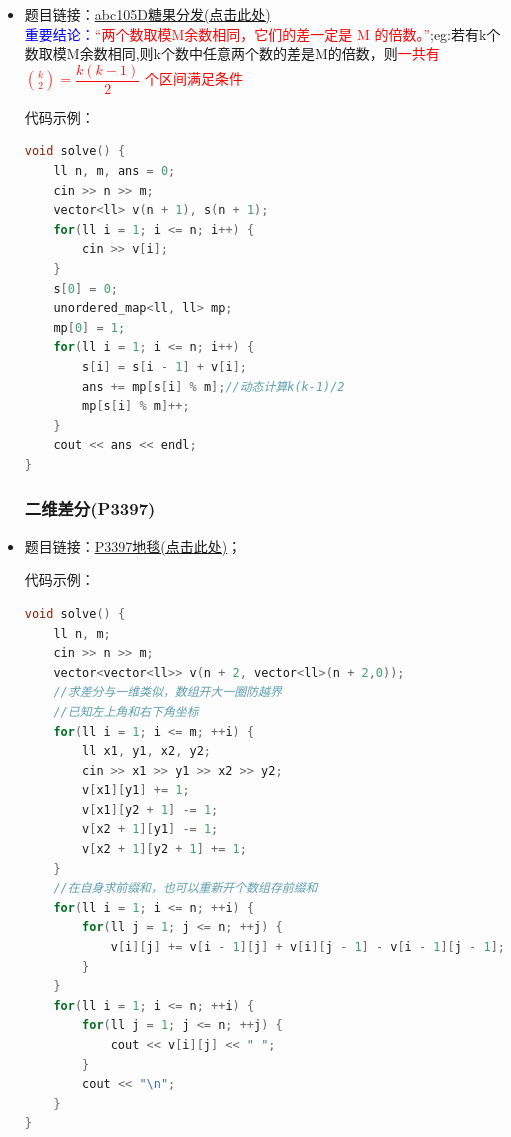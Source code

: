 \begin{itemize}
\begin{lstlisting}[language=C++]
int main() {
	i64 n, m, c;
	cin >> n >> m >> c;
	for (i64 i = 1; i <= n; i++) {
		for (i64 j = 1; j <= m; j++) {
			cin >> v[i][j];
		}
	}
	//计算每个位置的前缀和，以便计算后面的区间和；
	for (i64 i = 1; i <= n; i++) {
		for (i64 j = 1; j <= m; j++) {
			a[i][j] = a[i - 1][j] + a[i][j - 1] - a[i - 1][j - 1] + v[i][j];
		}
	}
	i64 x1, x2, y1, y2, max = 0, row = 0, col = 0;
	for (i64 k = 1; k <= m - c + 1; k++) {
		for (i64 t = 1; t <= n - c + 1; t++) {
			x1 = k;
			y1 = t;
			x2 = x1 + c - 1;
			y2 = y1 + c - 1;
			//知道区间的左上角和右下角坐标就可以求这个矩形内的和
			if ((a[x2][y2] - a[x2][y1 - 1] - a[x1 - 1][y2] + a[x1 - 1][y1 - 1]) > max) {
				max = a[x2][y2] - a[x2][y1 - 1] - a[x1 - 1][y2] + a[x1 - 1][y1 - 1];
				row = x1;
				col = y1;
			}
		}
	}
	cout << row << " " << col << endl;
	return 0;
}

\end{lstlisting}
\subsubsection{前缀和取模应用(abc105D)}
\item 题目链接：\href{https://atcoder.jp/contests/abc105/tasks/abc105_d}{abc105D糖果分发(点击此处)}\\ \textcolor{blue}{重要结论：}\textcolor{red}{“两个数取模M余数相同，它们的差一定是 M 的倍数。”};eg:若有k个数取模M余数相同,则k个数中任意两个数的差是M的倍数，则\textcolor{red}{一共有 $\binom{k}{2}=\dfrac{k(k-1)}{2}$ 个区间满足条件}

代码示例：\\
\begin{lstlisting}[language=C++]
void solve() {
	ll n, m, ans = 0;
	cin >> n >> m;
	vector<ll> v(n + 1), s(n + 1);
	for(ll i = 1; i <= n; i++) {
		cin >> v[i];
	}
	s[0] = 0;
	unordered_map<ll, ll> mp;
	mp[0] = 1;
	for(ll i = 1; i <= n; i++) {
		s[i] = s[i - 1] + v[i];
		ans += mp[s[i] % m];//动态计算k(k-1)/2
		mp[s[i] % m]++;
	}
	cout << ans << endl;
}
\end{lstlisting}
\subsubsection{二维差分(P3397)}
\item 题目链接：\href{https://www.luogu.com.cn/problem/P3397}{P3397地毯(点击此处)}；

代码示例：\\
\begin{lstlisting}[language=C++]
void solve() {
	ll n, m;
	cin >> n >> m;
	vector<vector<ll>> v(n + 2, vector<ll>(n + 2,0));
	//求差分与一维类似，数组开大一圈防越界
	//已知左上角和右下角坐标
	for(ll i = 1; i <= m; ++i) {
		ll x1, y1, x2, y2;
		cin >> x1 >> y1 >> x2 >> y2;
		v[x1][y1] += 1;
		v[x1][y2 + 1] -= 1;
		v[x2 + 1][y1] -= 1;
		v[x2 + 1][y2 + 1] += 1;
	}
	//在自身求前缀和，也可以重新开个数组存前缀和
	for(ll i = 1; i <= n; ++i) {
		for(ll j = 1; j <= n; ++j) {
			v[i][j] += v[i - 1][j] + v[i][j - 1] - v[i - 1][j - 1];
		}
	}
	for(ll i = 1; i <= n; ++i) {
		for(ll j = 1; j <= n; ++j) {
			cout << v[i][j] << " ";
		}
		cout << "\n";
	}
}


\end{lstlisting}
\end{itemize}
